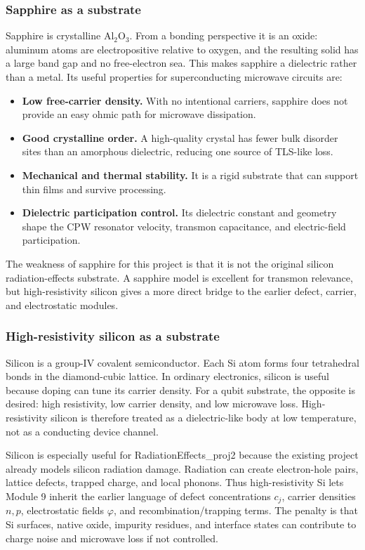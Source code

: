 \documentclass[11pt]{article}
\begin{document}
\subsubsection{Sapphire as a substrate}
Sapphire is crystalline $\mathrm{Al_2O_3}$. From a bonding perspective it is an oxide: aluminum atoms are electropositive relative to oxygen, and the resulting solid has a large band gap and no free-electron sea. This makes sapphire a dielectric rather than a metal. Its useful properties for superconducting microwave circuits are:
\begin{itemize}[leftmargin=1.5em]
    \item \textbf{Low free-carrier density.} With no intentional carriers, sapphire does not provide an easy ohmic path for microwave dissipation.
    \item \textbf{Good crystalline order.} A high-quality crystal has fewer bulk disorder sites than an amorphous dielectric, reducing one source of TLS-like loss.
    \item \textbf{Mechanical and thermal stability.} It is a rigid substrate that can support thin films and survive processing.
    \item \textbf{Dielectric participation control.} Its dielectric constant and geometry shape the CPW resonator velocity, transmon capacitance, and electric-field participation.
\end{itemize}
The weakness of sapphire for this project is that it is not the original silicon radiation-effects substrate. A sapphire model is excellent for transmon relevance, but high-resistivity silicon gives a more direct bridge to the earlier defect, carrier, and electrostatic modules.

\subsubsection{High-resistivity silicon as a substrate}
Silicon is a group-IV covalent semiconductor. Each Si atom forms four tetrahedral bonds in the diamond-cubic lattice. In ordinary electronics, silicon is useful because doping can tune its carrier density. For a qubit substrate, the opposite is desired: high resistivity, low carrier density, and low microwave loss. High-resistivity silicon is therefore treated as a dielectric-like body at low temperature, not as a conducting device channel.

Silicon is especially useful for RadiationEffects\_proj2 because the existing project already models silicon radiation damage. Radiation can create electron-hole pairs, lattice defects, trapped charge, and local phonons. Thus high-resistivity Si lets Module 9 inherit the earlier language of defect concentrations $c_j$, carrier densities $n,p$, electrostatic fields $\varphi$, and recombination/trapping terms. The penalty is that Si surfaces, native oxide, impurity residues, and interface states can contribute to charge noise and microwave loss if not controlled.
\end{document}
